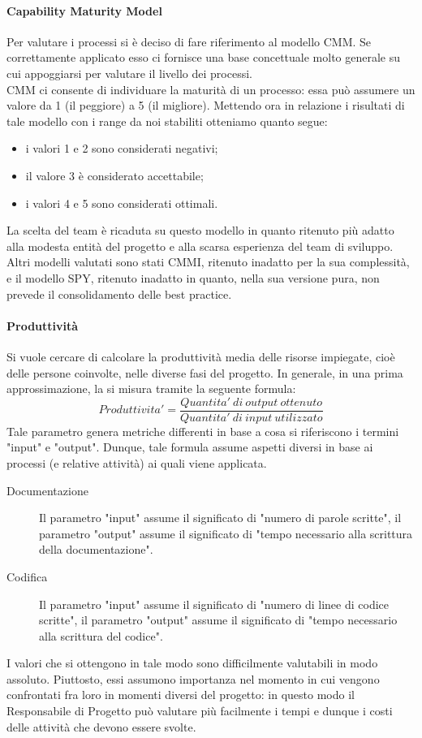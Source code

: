 				\paragraph{Capability Maturity Model}
					Per valutare i processi si è deciso di fare riferimento al modello CMM. Se correttamente applicato esso ci fornisce una base 
					concettuale molto generale su cui appoggiarsi per valutare il livello dei processi.\\
					CMM ci consente di individuare la maturità di un processo: essa può assumere un valore da 1 (il peggiore) a 5 (il migliore). Mettendo 
					ora in relazione i risultati di tale modello con i range da noi stabiliti otteniamo quanto segue:
					\begin{itemize}
						\item i valori 1 e 2 sono considerati negativi;
						\item il valore 3 è considerato accettabile;
						\item i valori 4 e 5 sono considerati ottimali.
					\end{itemize}
					La scelta del team è ricaduta su questo modello in quanto ritenuto più adatto alla modesta entità del progetto e alla scarsa esperienza del 
					team di sviluppo. Altri modelli valutati sono stati CMMI, ritenuto inadatto per la sua complessità, e il modello SPY, ritenuto inadatto in 
					quanto, nella sua versione pura, non prevede il consolidamento delle best practice.
				\paragraph{Produttività}
					Si vuole cercare di calcolare la produttività media delle risorse impiegate, cioè delle persone coinvolte, nelle diverse fasi del 
					progetto. In generale, in una prima approssimazione, la si misura tramite la seguente formula:
					\begin{equation}
						Produttivita' = \frac{Quantita'\ di\ output\ ottenuto}{Quantita'\ di\ input\ utilizzato}
						\label{Produttività}
					\end{equation}
					Tale parametro genera metriche differenti in base a cosa si riferiscono i termini "input" e "output". Dunque, tale formula assume 
					aspetti diversi in base ai processi (e relative attività) ai quali viene applicata.
					\begin{description}
						\item[Documentazione] Il parametro "input" assume il significato di "numero di parole scritte", il parametro "output" assume il 
						significato di "tempo necessario alla scrittura della documentazione".
						\item[Codifica] Il parametro "input" assume il significato di "numero di linee di codice scritte", il parametro "output" assume 
						il significato di "tempo necessario alla scrittura del codice".
					\end{description}
					I valori che si ottengono in tale modo sono difficilmente valutabili in modo assoluto. Piuttosto, essi assumono importanza nel 
					momento in cui vengono confrontati fra loro in momenti diversi del progetto: in questo modo il Responsabile di Progetto può valutare 
					più facilmente i tempi e dunque i costi delle attività che devono essere svolte.
